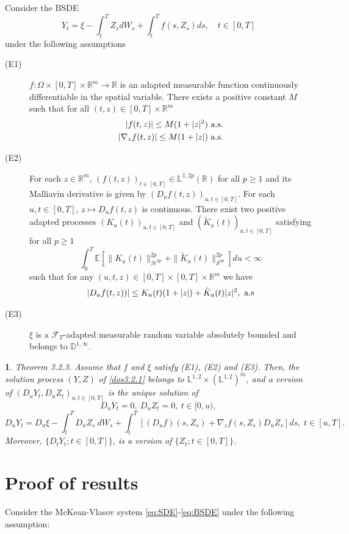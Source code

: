 \documentclass[12,english]{amsart}
\theoremstyle{plain}
\newtheorem{thm}{\protect\theoremname}
\theoremstyle{definition}
\theoremstyle{plain}
\theoremstyle{plain}
\theoremstyle{remark}
\providecommand{\theoremname}{Theorem}
\newcommand{\E}{\mathbb E}
\newcommand{\D}{\mathbb D}
\newcommand{\R}{\mathbb R}
\newcommand{\cF}{\mathcal F}
\newcommand{\cH}{\mathcal H}
\newcommand{\cS}{\mathcal S}
\newcommand{\Om}{\Omega}
\newcommand{\mL}{\mathbb L}
\begin{document}
Consider the BSDE
\begin{equation}
  \label{dos3.2.1}
  Y_t = \xi - \int_t^TZ_sdW_s + \int_t^T f(s,Z_s)ds,\quad t \in  [0,T]
\end{equation}
under the following assumptions
\begin{description}
\item[(E1)] $f : \Om\times[0,T]\times\R^m\to\R$ is an adapted
measurable function continuously differentiable in the spatial
variable. There exists a positive constant $M$ such that for all
$(t,z) \in  [0, T ] \times \R^m$
\begin{align*}
  |f(t, z)| \le M(1 + |z|^2) \hbox { a.s.}\\
|\nabla_z f (t, z)| \le M (1 + |z|) \hbox { a.s.}
\end{align*}
\item[(E2)]  For each $z \in  \R^m$, $(f(t,z))_{t\in [0,T]} \in\mL
  ^{1,2p}(\R)$ for all $p\ge 1$ and its Malliavin derivative is given by
  $(D_uf(t,z))_{u,t\in [0,T]}$. For each $u,t \in[0,T]$, $z\mapsto
  D_uf(t,z)$ is continuous. There exist two positive adapted processes
  $(K_u(t))_{u,t\in [0,T ]}$ and $(\tilde K_u(t))_{u,t\in[0,T]}$
  satisfying for all $p\ge  1$
\[\int_0^T\E[\|K_u(t)\|_{\cH^{2p}}^{2p} +\|\tilde K_u(t)\|_{\cS^{2p}}^{2p}] du < \infty\]
such that for any $(u,t,z)\in [0,T]\times[0,T]\times\R^m$ we have
\[|D_uf(t,z))|\le K_u(t)(1+|z|)+\tilde K_u(t)|z|^2, \hbox { a.s}\]
\item [(E3)] $\xi$ is a $\cF_T$-adapted measurable random variable
  absolutely bounded and belongs to $\D^{1,\infty}$.
\end{description}
\begin{thm}\label{paramMalliavin}\cite{dos2010some} Theorem 3.2.3.
  Assume that $f$ and $\xi$ satisfy (E1), (E2) and (E3). Then, the
  solution process $(Y,Z)$ of \eqref{dos3.2.1} belongs to
  $\mL^{1,2}\times(\mL^{1,2})^m$, and a version of
  $(D_uY_t,D_uZ_t)_{u, t\in[0,T]}$ is the unique solution of
  \[
D_uY_t=0,\ D_uZ_t=0,\ t\in[0,u),
\]
\[D_uY_t= D_u\xi-\int_t^TD_uZ_s\ dW_s+\int_t^T[(D_uf)(s,Z_s)+\nabla_z
  f(s,Z_s)D_uZ_s]ds,\; t\in[u,T].\]
Moreover, $\{ D_tY_t;t\in[0,T]\} $, is a version of $\{ Z_t;t\in[0,T]\} $.
\end{thm}
\section{Proof of results}
\label{sec:proof-results}

Consider the McKean-Vlasov system \eqref{eq:SDE}-\eqref{eq:BSDE} under the following assumption:
\end{document}
